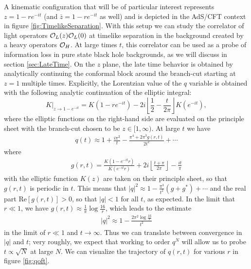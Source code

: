 \documentclass[12pt]{article}
\numberwithin{equation}{section}
\newcommand{\be}{\begin{eqnarray}}
\newcommand{\ee}{\end{eqnarray}}
\newcommand{\CO}{{\cal O}}
\begin{document}
A kinematic configuration that will be of particular interest represents $z = 1 - r e^{-i t}$  (and $\bar z = 1 - r e^{-it}$ as well) and is  depicted in the AdS/CFT context in figure \ref{fig:TimelikeSeparation}.   With this setup we can study the correlator of light operators $\CO_L(z) \CO_L(0)$ at timelike separation in the background created by a heavy operators $\CO_H$.  At large times $t$, this correlator can be used as a probe of information loss in pure state black hole backgrounds, as we will discuss in section \ref{sec:LateTime}.  On the $z$ plane, the late time behavior is obtained by analytically continuing the conformal block around the branch-cut starting at $z=1$ multiple times. Explicitly, the Lorentzian value of the $q$ variable is obtained with the following analytic continuation of the elliptic integral: 
\begin{equation}
\left.K\right|_{z\rightarrow1-e^{-it}}=K(1-re^{-it})-2i \left\lfloor \frac{1}{2}-\frac{t}{2\pi}\right\rfloor K(e^{-it}),
\end{equation}
where the elliptic functions on the right-hand side are evaluated on the principle sheet with the branch-cut chosen to be $z\in[1,\infty)$. At large $t$ we have
\be
q(t) \approx 1 + \frac{i \pi^2}{t} - \frac{\pi^4 + 2\pi^3 g(r,t)}{2 t^2} + \cdots 
\label{eq:LargeTimeqApprox}
\ee
where
\be
g(r,t) = \frac{K\left(1-e^{-i t} r\right)}{K\left(e^{-i t} r \right)}+2 i \left\lfloor \frac{t+\pi}{2 \pi }\right\rfloor -\frac{i t}{\pi } 
\ee
with the elliptic function $K(z)$ are taken on their principle sheet, so that $g(r,t)$ is periodic in $t$.    This means that $|q|^2 \approx 1 - \frac{\pi^3}{t^2} (g + g^*) + \cdots$ and the real part Re$[g(r,t)] > 0$, so that $|q| < 1$ for all $t$, as expected.  In the limit that $r \ll 1$, we have $g(r,t) \approx \frac{1}{\pi} \log \frac{16}{r}$, which leads to the estimate  
\be
|q|^2 \approx 1 - \frac{2 \pi^2 \log \frac{16}{r} }{t^2}
\ee
in the limit of $r \ll 1$ and $t \to \infty$.  Thus we can translate between convergence in $|q|$ and $t$; very roughly, we expect that working to order $q^N$ will allow us to probe $t \propto \sqrt{N}$ at large $N$.  We can visualize the trajectory of $q(r,t)$ for various $r$ in figure \ref{fig:qoft}.
\end{document}
